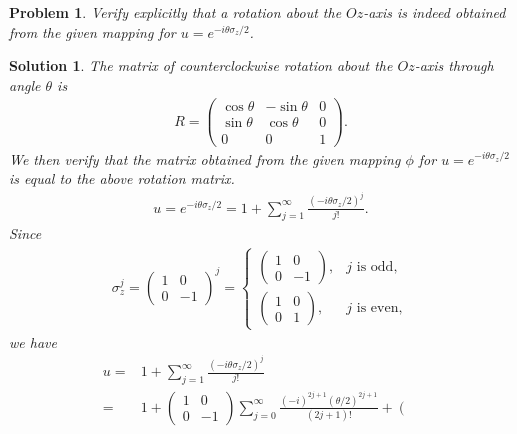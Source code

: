 \documentclass[UTF8,10pt,a4paper]{article}
\theoremstyle{Problem}
\newtheorem{prob}{Problem}
\theoremstyle{Solution}
\newtheorem*{sol}{Solution}
\begin{document}
\begin{prob}
    Verify explicitly that a rotation about the $Oz$-axis is indeed obtained from the given mapping for $u=e^{-i\theta\sigma_z/2}$.
\end{prob}
\begin{sol}
    The matrix of counterclockwise rotation about the $Oz$-axis through angle $\theta$ is
    \begin{align}
        R=\left(\begin{matrix}
            \cos\theta&-\sin\theta&0\\
            \sin\theta&\cos\theta&0\\
            0&0&1
        \end{matrix}\right).
    \end{align}
    We then verify that the matrix obtained from the given mapping $\phi$ for $u=e^{-i\theta\sigma_z/2}$ is equal to the above rotation matrix.
    \begin{align}
        u=e^{-i\theta\sigma_z/2}=1+\sum_{j=1}^{\infty}\frac{(-i\theta\sigma_z/2)^j}{j!}.
    \end{align}
    Since
    \begin{align}
        \sigma_z^j=\left(\begin{matrix}
            1&0\\
            0&-1
        \end{matrix}\right)^j=\left\{\begin{array}{ll}
            \left(\begin{matrix}
                1&0\\
                0&-1
            \end{matrix}\right),&j\text{ is odd},\\
            \left(\begin{matrix}
                1&0\\
                0&1
            \end{matrix}\right),&j\text{ is even},
        \end{array}\right.
    \end{align}
    we have
    \begin{align}
        \nonumber u=&1+\sum_{j=1}^{\infty}\frac{(-i\theta\sigma_z/2)^j}{j!}\\
        \nonumber=&1+\left(\begin{matrix}
            1&0\\
            0&-1
        \end{matrix}\right)\sum_{j=0}^{\infty}\frac{(-i)^{2j+1}(\theta/2)^{2j+1}}{(2j+1)!}+\left(\begin{matrix}

\end{matrix}
\end{align}
\end{sol}
\end{document}
